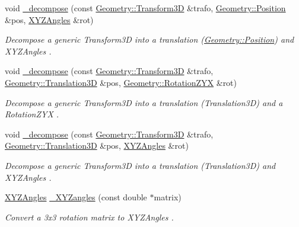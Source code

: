 \begin{DoxyCompactItemize}
void \hyperlink{group___d_d4_h_e_p___g_e_o_m_e_t_r_y_gad0cc5511671f40c3394c8688e7a2316f}{\+\_\+decompose} (const \hyperlink{namespace_d_d4hep_1_1_geometry_aeb4c0356d12fd7be49a0aae50514e64b}{Geometry\+::\+Transform3D} \&trafo, \hyperlink{namespace_d_d4hep_1_1_geometry_a55083902099d03506c6db01b80404900}{Geometry\+::\+Position} \&pos, \hyperlink{namespace_d_d4hep_1_1_geometry_ab195c63789d4928d291d3b5522151aaa}{X\+Y\+Z\+Angles} \&rot)
\begin{DoxyCompactList}\small\item\em Decompose a generic Transform3D into a translation (\hyperlink{namespace_d_d4hep_1_1_geometry_a55083902099d03506c6db01b80404900}{Geometry\+::\+Position}) and X\+Y\+Z\+Angles . \end{DoxyCompactList}\item 
void \hyperlink{group___d_d4_h_e_p___g_e_o_m_e_t_r_y_ga46814636f071d07ca4567f3244884664}{\+\_\+decompose} (const \hyperlink{namespace_d_d4hep_1_1_geometry_aeb4c0356d12fd7be49a0aae50514e64b}{Geometry\+::\+Transform3D} \&trafo, \hyperlink{namespace_d_d4hep_1_1_geometry_ab90afde486c9b46f4fa91bc659271b99}{Geometry\+::\+Translation3D} \&pos, \hyperlink{namespace_d_d4hep_1_1_geometry_a24667b2b9c3cec3d5239828db4d52189}{Geometry\+::\+Rotation\+Z\+YX} \&rot)
\begin{DoxyCompactList}\small\item\em Decompose a generic Transform3D into a translation (Translation3D) and a Rotation\+Z\+YX . \end{DoxyCompactList}\item 
void \hyperlink{group___d_d4_h_e_p___g_e_o_m_e_t_r_y_gafde0308d492794fe4b55f66247921482}{\+\_\+decompose} (const \hyperlink{namespace_d_d4hep_1_1_geometry_aeb4c0356d12fd7be49a0aae50514e64b}{Geometry\+::\+Transform3D} \&trafo, \hyperlink{namespace_d_d4hep_1_1_geometry_ab90afde486c9b46f4fa91bc659271b99}{Geometry\+::\+Translation3D} \&pos, \hyperlink{namespace_d_d4hep_1_1_geometry_ab195c63789d4928d291d3b5522151aaa}{X\+Y\+Z\+Angles} \&rot)
\begin{DoxyCompactList}\small\item\em Decompose a generic Transform3D into a translation (Translation3D) and X\+Y\+Z\+Angles . \end{DoxyCompactList}\item 
\hyperlink{namespace_d_d4hep_1_1_geometry_ab195c63789d4928d291d3b5522151aaa}{X\+Y\+Z\+Angles} \hyperlink{group___d_d4_h_e_p___g_e_o_m_e_t_r_y_ga446608ca1668ae2b3ad24c3ea5b2bc1e}{\+\_\+\+X\+Y\+Zangles} (const double $\ast$matrix)
\begin{DoxyCompactList}\small\item\em Convert a 3x3 rotation matrix to X\+Y\+Z\+Angles . \end{DoxyCompactList}\item 

\end{DoxyCompactItemize}
